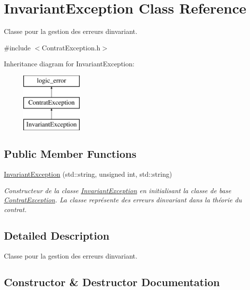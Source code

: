 \hypertarget{classInvariantException}{}\section{Invariant\+Exception Class Reference}
\label{classInvariantException}


Classe pour la gestion des erreurs d\textquotesingle{}invariant.  




{\ttfamily \#include $<$Contrat\+Exception.\+h$>$}

Inheritance diagram for Invariant\+Exception\+:\begin{figure}[H]
\begin{center}
\leavevmode
\includegraphics[height=3.000000cm]{classInvariantException}
\end{center}
\end{figure}
\subsection*{Public Member Functions}
\begin{DoxyCompactItemize}
\item 
\hyperlink{classInvariantException_af8a1950834b26c256db0b11eb33e6056}{Invariant\+Exception} (std\+::string, unsigned int, std\+::string)
\begin{DoxyCompactList}\small\item\em Constructeur de la classe \hyperlink{classInvariantException}{Invariant\+Exception} en initialisant la classe de base \hyperlink{classContratException}{Contrat\+Exception}. La classe représente des erreurs d\textquotesingle{}invariant dans la théorie du contrat. \end{DoxyCompactList}\end{DoxyCompactItemize}


\subsection{Detailed Description}
Classe pour la gestion des erreurs d\textquotesingle{}invariant. 

\subsection{Constructor \& Destructor Documentation}
\mbox{\label{classInvariantException_af8a1950834b26c256db0b11eb33e6056}} 
